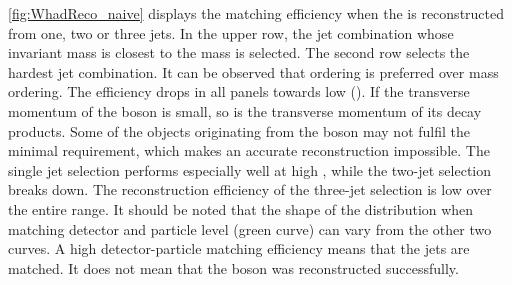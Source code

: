 \cref{fig:WhadReco_naive} displays the matching efficiency when the \Wboson
is reconstructed from one, two or three jets. 
In the upper row, the jet
combination whose invariant mass is closest to the \Wboson mass is selected.
The second row selects the hardest jet combination.
It can be observed that \pt ordering is preferred over mass ordering.
The efficiency drops in all panels towards low \pt(\Whad). If the transverse
momentum of the \Wboson boson is small, so is the transverse momentum of its
decay products. Some of the objects originating from the \Wboson boson may not
fulfil the minimal \pt requirement, which makes an accurate reconstruction
impossible. The single jet selection performs especially well at high \pt,
while the two-jet selection breaks down. The reconstruction efficiency of
the three-jet selection is low over the entire \pt range.
It should be noted that the shape of the distribution when matching detector
and particle level (green curve) can vary from the other two curves.
A high detector-particle matching efficiency means that the jets are matched.
It does not mean that the \Wboson boson was reconstructed successfully.

